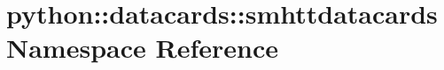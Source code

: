\hypertarget{namespacepython_1_1datacards_1_1smhttdatacards}{
\section{python::datacards::smhttdatacards Namespace Reference}
\label{namespacepython_1_1datacards_1_1smhttdatacards}
}
